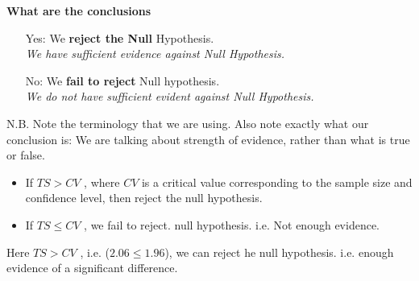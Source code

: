 \documentclass[a4paper,12pt]{article}
\begin{document}
\begin{framed}
\noindent \textbf{What are the conclusions}
\begin{itemize} 

\item[Yes:] We \textbf{reject the Null} Hypothesis. \\ \textit{We have sufficient evidence against Null Hypothesis.}

\item[No:] We \textbf{fail to reject} Null hypothesis. \\ \textit{We do not have sufficient evident against Null Hypothesis.}
\end{itemize}
{\normalsize
N.B. Note the terminology that we are using. Also note exactly what our conclusion is: We are talking about strength of evidence, rather than what is true or false.}

\end{framed}
\smallskip
\begin{framed}
\begin{itemize}
\item If $TS > CV$ , where $CV$ is a critical value corresponding to the sample size and confidence level, then reject the null hypothesis. 
\item  If $TS \leq CV$ , we fail to reject. null hypothesis. i.e. Not enough evidence. 
\end{itemize}
\end{framed}

\noindent Here $TS > CV$ , i.e. ($2.06\leq 1.96$), we can reject he null hypothesis. i.e. enough evidence of a significant difference. 
\end{document}
